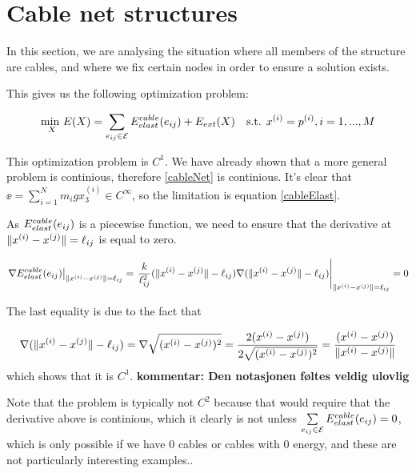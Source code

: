 \section{Cable net structures}
In this section, we are analysing the situation where all members of the structure are cables, and where we fix certain nodes in order to ensure a solution exists.

This gives us the following optimization problem:

\begin{equation}
    \underset{X}{\text{min }} E(X) = \sum\limits_{e_{ij} \in \mathcal{E}} E^{cable}_{elast}(e_{ij}) + E_{ext}(X) \quad \text{s.t. } x^{(i)} = p^{(i)}, i = 1,...,M
    \label{cableNet}
\end{equation}

This optimization problem is $C^1$. We have already shown that a more general problem is continious, therefore \eqref{cableNet} is continious. It's clear that $\ee = \sum_{i=1}^N m_i g x_3^{(i)} \in C^{\infty}$, so the limitation is equation \eqref{cableElast}.

As $E^{cable}_{elast}(e_{ij})$ is a piecewise function, we need to ensure that the derivative at $\lVert x^{(i)} - x^{(j)}\rVert = \ell_{ij}$ is equal to zero.

\begin{equation}
    \left.\nabla E^{cable}_{elast}(e_{ij})\right|_{\lVert x^{(i)} - x^{(j)}\rVert = \ell_{ij}} = \left. \frac{k}{\ell_{ij}^2}(\lVert x^{(i)} - x^{(j)}\rVert - \ell_{ij}) \nabla (\lVert x^{(i)} - x^{(j)}\rVert-\ell_{ij}) \right|_{\lVert x^{(i)} - x^{(j)}\rVert = \ell_{ij}} = 0
\end{equation}

The last equality is due to the fact that

\begin{equation}
    \nabla (\lVert x^{(i)} - x^{(j)}\rVert - \ell_{ij}) = \nabla \sqrt{(x^{(i)} -x^{(j)})^2} = \frac{2(x^{(i)} - x^{(j)})}{2 \sqrt{(x^{(i)} -x^{(j)})^2} } = \frac{(x^{(i)} - x^{(j)})}{\lVert x^{(i)} - x^{(j)}\rVert}
\end{equation}
which shows that it is $C^1$.
\textbf{kommentar: Den notasjonen føltes veldig ulovlig}

Note that the problem is typically not $C^2$ because that would require that the derivative above is continious, which it clearly is not unless
$\sum\limits_{e_{ij} \in \mathcal{E}} E^{cable}_{elast}(e_{ij}) = 0$, which is only possible if we have $0$ cables or cables with $0$ energy, and these are not particularly interesting examples..